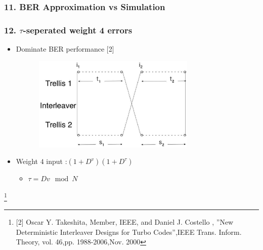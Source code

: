 \documentclass{beamer}  %
\newcommand\blfootnote[1]{%
  \begingroup
  \renewcommand\thefootnote{}\footnote{#1}%
  \addtocounter{footnote}{-1}%
  \endgroup
}
\begin{document}

\begin{frame}
\frametitle{11. BER Approximation vs Simulation}




\end{frame}


\begin{frame}
\frametitle{12.  $\tau$-seperated weight 4 errors}
\begin{itemize}
\item Dominate BER performance [2]
\begin{center}
\includegraphics[height = 4.5cm,width=0.8\textwidth]{weight4.eps}
\end{center}


\item Weight $4$ input :$ (1+D^v)(1+D^{\tau})$

\begin{itemize}
 \item $\tau = Dv  \mod N$
\end{itemize}

\end{itemize}
\blfootnote {[2] Oscar Y. Takeshita, Member, IEEE, and Daniel J. Costello ,
''New Deterministic Interleaver Designs for Turbo Codes'',IEEE Trans. Inform. 
Theory, vol.  46,pp. 1988-2006,Nov. 2000}
\end{frame}
\end{document}

